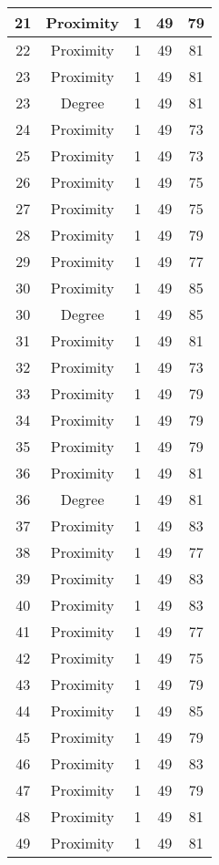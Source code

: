 \documentclass[results.tex]{subfiles}
\begin{document}
\begin{center}
\begin{tabular}{| c || c | c | c | c |}
    \hline
    21 & Proximity & 1 & 49 & 79 \\ 
    \hline
    22 & Proximity & 1 & 49 & 81 \\ 
    \hline
    23 & Proximity & 1 & 49 & 81 \\ 
    \hline
    23 & Degree & 1 & 49 & 81 \\ 
    \hline
    24 & Proximity & 1 & 49 & 73 \\ 
    \hline
    25 & Proximity & 1 & 49 & 73 \\ 
    \hline
    26 & Proximity & 1 & 49 & 75 \\ 
    \hline
    27 & Proximity & 1 & 49 & 75 \\ 
    \hline
    28 & Proximity & 1 & 49 & 79 \\ 
    \hline
    29 & Proximity & 1 & 49 & 77 \\ 
    \hline
    30 & Proximity & 1 & 49 & 85 \\ 
    \hline
    30 & Degree & 1 & 49 & 85 \\ 
    \hline
    31 & Proximity & 1 & 49 & 81 \\ 
    \hline
    32 & Proximity & 1 & 49 & 73 \\ 
    \hline
    33 & Proximity & 1 & 49 & 79 \\ 
    \hline
    34 & Proximity & 1 & 49 & 79 \\ 
    \hline
    35 & Proximity & 1 & 49 & 79 \\ 
    \hline
    36 & Proximity & 1 & 49 & 81 \\ 
    \hline
    36 & Degree & 1 & 49 & 81 \\ 
    \hline
    37 & Proximity & 1 & 49 & 83 \\ 
    \hline
    38 & Proximity & 1 & 49 & 77 \\ 
    \hline
    39 & Proximity & 1 & 49 & 83 \\ 
    \hline
    40 & Proximity & 1 & 49 & 83 \\ 
    \hline
    41 & Proximity & 1 & 49 & 77 \\ 
    \hline
    42 & Proximity & 1 & 49 & 75 \\ 
    \hline
    43 & Proximity & 1 & 49 & 79 \\ 
    \hline
    44 & Proximity & 1 & 49 & 85 \\ 
    \hline
    45 & Proximity & 1 & 49 & 79 \\ 
    \hline
    46 & Proximity & 1 & 49 & 83 \\ 
    \hline
    47 & Proximity & 1 & 49 & 79 \\ 
    \hline
    48 & Proximity & 1 & 49 & 81 \\ 
    \hline
    49 & Proximity & 1 & 49 & 81 \\ 
    \hline   \end{tabular}
\end{center}
\end{document}
